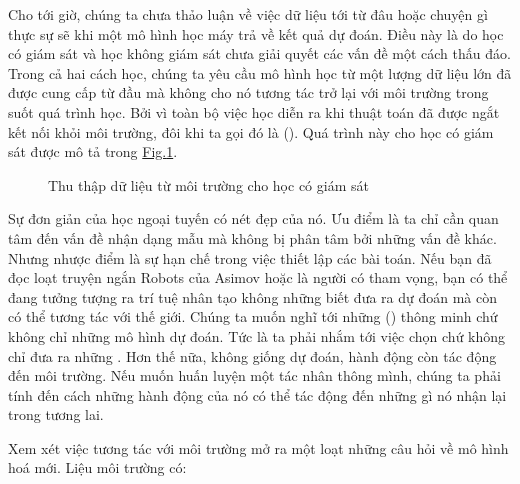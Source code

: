 \documentclass[letterpaper,11pt,english]{sphinxmanual}
\begin{document}
Cho tới giờ, chúng ta chưa thảo luận về việc dữ liệu tới từ đâu hoặc
chuyện gì thực sự sẽ  khi một mô hình học máy trả về kết quả dự
đoán. Điều này là do học có giám sát và học không giám sát chưa giải
quyết các vấn đề một cách thấu đáo. Trong cả hai cách học, chúng ta yêu
cầu mô hình học từ một lượng dữ liệu lớn đã được cung cấp từ đầu mà
không cho nó tương tác trở lại với môi trường trong suốt quá trình học.
Bởi vì toàn bộ việc học diễn ra khi thuật toán đã được ngắt kết nối khỏi
môi trường, đôi khi ta gọi đó là  ().
Quá trình này cho học có giám sát được mô tả trong
\hyperref[\detokenize{chapter_introduction/index_vn:fig-data-collection}]{Fig.\@ \ref{\detokenize{chapter_introduction/index_vn:fig-data-collection}}}.



\begin{figure}[H]
\centering
\capstart

\noindent{}
\caption{Thu thập dữ liệu từ môi trường cho học có giám sát}\label{\detokenize{chapter_introduction/index_vn:id16}}\label{\detokenize{chapter_introduction/index_vn:fig-data-collection}}\end{figure}



Sự đơn giản của học ngoại tuyến có nét đẹp của nó. Ưu điểm là ta chỉ cần
quan tâm đến vấn đề nhận dạng mẫu mà không bị phân tâm bởi những vấn đề
khác. Nhưng nhược điểm là sự hạn chế trong việc thiết lập các bài toán.
Nếu bạn đã đọc loạt truyện ngắn Robots của Asimov hoặc là người có tham
vọng, bạn có thể đang tưởng tượng ra trí tuệ nhân tạo không những biết
đưa ra dự đoán mà còn có thể tương tác với thế giới. Chúng ta muốn nghĩ
tới những  () thông minh chứ không chỉ những mô hình dự
đoán. Tức là ta phải nhắm tới việc chọn  chứ không chỉ đưa ra
những . Hơn thế nữa, không giống dự đoán, hành động còn tác
động đến môi trường. Nếu muốn huấn luyện một tác nhân thông mình, chúng
ta phải tính đến cách những hành động của nó có thể tác động đến những
gì nó nhận lại trong tương lai.



Xem xét việc tương tác với môi trường mở ra một loạt những câu hỏi về mô
hình hoá mới. Liệu môi trường có:
\end{document}
